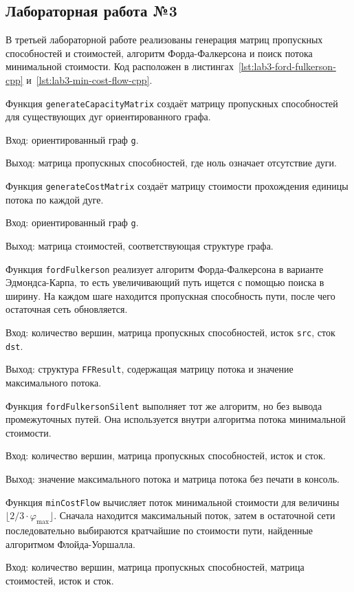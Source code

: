 \documentclass[a4paper,final]{article}
\begin{document}
\subsection{Лабораторная работа №3}

В третьей лабораторной работе реализованы генерация матриц пропускных способностей и стоимостей, алгоритм Форда-Фалкерсона и поиск потока минимальной стоимости. Код расположен в листингах~\ref{lst:lab3-ford-fulkerson-cpp} и~\ref{lst:lab3-min-cost-flow-cpp}.

Функция \texttt{generateCapacityMatrix} создаёт матрицу пропускных способностей для существующих дуг ориентированного графа.

Вход: ориентированный граф \texttt{g}.

Выход: матрица пропускных способностей, где ноль означает отсутствие дуги.

Функция \texttt{generateCostMatrix} создаёт матрицу стоимости прохождения единицы потока по каждой дуге.

Вход: ориентированный граф \texttt{g}.

Выход: матрица стоимостей, соответствующая структуре графа.

Функция \texttt{fordFulkerson} реализует алгоритм Форда-Фалкерсона в варианте Эдмондса-Карпа, то есть увеличивающий путь ищется с помощью поиска в ширину. На каждом шаге находится пропускная способность пути, после чего остаточная сеть обновляется.

Вход: количество вершин, матрица пропускных способностей, исток \texttt{src}, сток \texttt{dst}.

Выход: структура \texttt{FFResult}, содержащая матрицу потока и значение максимального потока.

Функция \texttt{fordFulkersonSilent} выполняет тот же алгоритм, но без вывода промежуточных путей. Она используется внутри алгоритма потока минимальной стоимости.

Вход: количество вершин, матрица пропускных способностей, исток и сток.

Выход: значение максимального потока и матрица потока без печати в консоль.

Функция \texttt{minCostFlow} вычисляет поток минимальной стоимости для величины $\lfloor 2/3 \cdot \varphi_{\max} \rfloor$. Сначала находится максимальный поток, затем в остаточной сети последовательно выбираются кратчайшие по стоимости пути, найденные алгоритмом Флойда-Уоршалла.

Вход: количество вершин, матрица пропускных способностей, матрица стоимостей, исток и сток.
\end{document}
